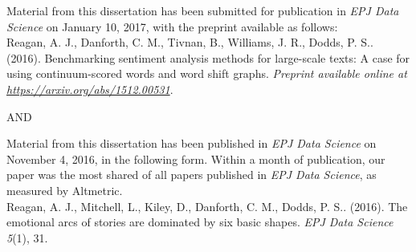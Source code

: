 \begin{citationspage}




\noindent Material from this dissertation has been submitted for publication in \textit{EPJ Data Science} on January 10, 2017, with the preprint available as follows:\\

\noindent Reagan, A. J., Danforth, C. M., Tivnan, B., Williams, J. R., Dodds, P. S.. (2016).
Benchmarking sentiment analysis methods for large-scale texts: A case for using continuum-scored words and word shift graphs.
\textit{Preprint available online at \href{https://arxiv.org/abs/1512.00531}{https://arxiv.org/abs/1512.00531}}.\\

\begin{center}
{\large AND}\\
\end{center}

\noindent Material from this dissertation has been published in \textit{EPJ Data Science} on November 4, 2016, in the following form.
Within a month of publication, our paper was the most shared of all papers published in \textit{EPJ Data Science}, as measured by Altmetric.\\

\noindent Reagan, A. J., Mitchell, L., Kiley, D., Danforth, C. M., Dodds, P. S.. (2016).
 The emotional arcs of stories are dominated by six basic shapes.
 \textit{EPJ Data Science 5}(1), 31.
\end{citationspage}
